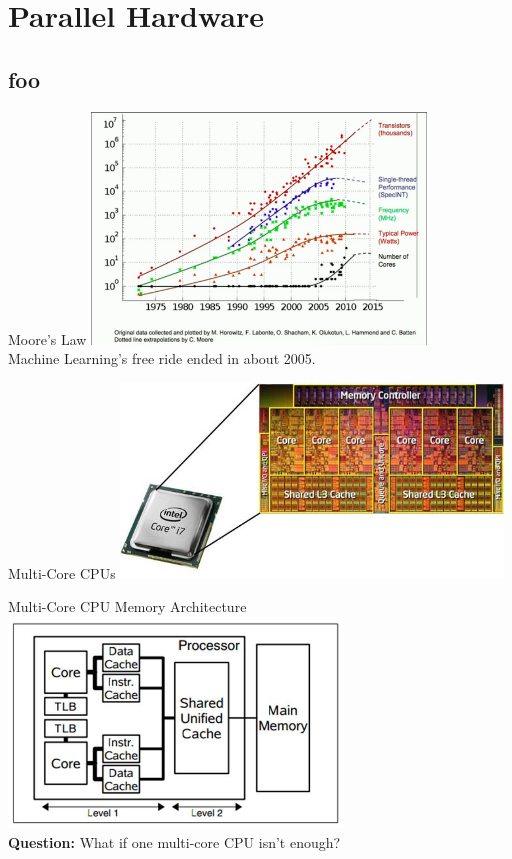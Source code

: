 \documentclass[serif,xcolor=pdftex,dvipsnames,table,hyperref={bookmarks=false,breaklinks}]{beamer}
\begin{document}
\maketitlepage



\section{Parallel Hardware}
\subsection{foo}

\begin{frame}[t]{Moore's Law}
\center
\includegraphics[width=3.5in]{../Figures/moores_law.png}\\[6pt]

\pause Machine Learning's free ride ended in about 2005.
\end{frame}

\begin{frame}[t]{Multi-Core CPUs}
\center
\includegraphics[width=4in]{../Figures/corei7.jpg}
\end{frame}

\begin{frame}[t]{Multi-Core CPU Memory Architecture}
\center
\includegraphics[width=3.5in]{../Figures/multi-core-architecture.jpg}\\[12pt]
\pause\textbf{Question:} What if one multi-core CPU isn't enough?
\end{frame}
\end{document}
